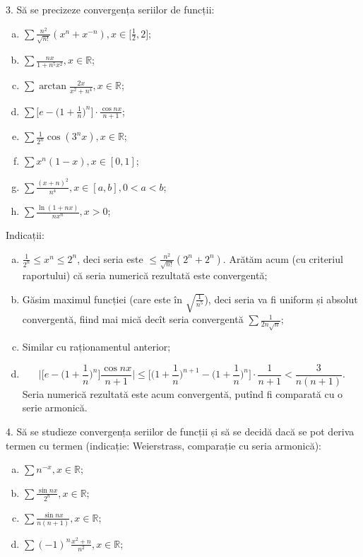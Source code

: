 \documentclass[11pt,a4paper]{article}
\newcommand\RR{\mathbb{R}}
\theoremstyle{dotless}
\theoremstyle{dotlessdr}
\begin{document}
3. Să se precizeze convergența seriilor de funcții:
\begin{enumerate}[(a)]
\item $\sum \frac{n^2}{\sqrt{n!}} (x^n + x^{-n}), x \in \Big[\frac{1}{2}, 2\Big]$;
\item $\sum \frac{nx}{1 + n^5 x^2}, x \in \RR$;
\item $\sum \arctan \frac{2x}{x^2 + n^4}, x \in \RR$;
\item $\sum \Big[ e - \Big( 1 + \frac{1}{n} \Big)^n \Big] \cdot \frac{\cos nx}{n + 1}$;
\item $\sum \frac{1}{2^n} \cos (3^n x), x \in \RR$;
\item $\sum x^n(1 - x), x \in [0, 1]$;
\item $\sum \frac{(x + n)^2}{n^4}, x \in [a, b], 0 < a < b$;
\item $\sum \frac{\ln(1 + nx)}{nx^n}, x > 0$;
\end{enumerate}

Indicații:
\begin{enumerate}[(a)]
\item $\frac{1}{2^n} \leq x^n \leq 2^n$, deci seria este $\leq \frac{n^2}{\sqrt{n!}} (2^n + 2^n)$.
  Arătăm acum (cu criteriul raportului) că seria numerică rezultată este convergentă;
\item Găsim maximul funcției (care este în $\sqrt{\frac{1}{n^5}}$), deci seria va fi uniform
  și absolut convergentă, fiind mai mică decît seria convergentă $\sum \frac{1}{2n \sqrt{n}}$;
\item Similar cu raționamentul anterior;
\item
  \[
    \Big| \big[ e - \big(1 + \frac{1}{n}\big)^n \big] \frac{\cos nx}{n+1} \Big| \leq
    \Big[ \big( 1 + \frac{1}{n} \big)^{n + 1} - \big(1 + \frac{1}{n}\big)^n \Big] \cdot \frac{1}{n+1} < \frac{3}{n(n+1)}.
  \]
  Seria numerică rezultată este acum convergentă, putînd fi comparată cu o serie armonică.
\end{enumerate}

\vspace{1cm}

4. Să se studieze convergența seriilor de funcții și să se decidă dacă
se pot deriva termen cu termen (indicație: Weierstrass, comparație cu
seria armonică):
\begin{enumerate}[(a)]
\item $\sum n^{-x}, x \in \RR$;
\item $\sum \frac{\sin nx}{2^n}, x \in \RR$;
\item $\sum \frac{\sin nx}{n(n+1)}, x \in \RR$;
\item $\sum (-1)^n \frac{x^2 + n}{n^2}, x \in \RR$;
\end{enumerate}
\end{document}
